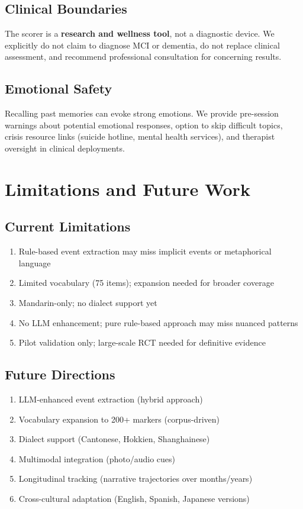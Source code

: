 \documentclass{article}
\begin{document}
\subsection{Clinical Boundaries}

The scorer is a \textbf{research and wellness tool}, not a diagnostic device. We explicitly do not claim to diagnose MCI or dementia, do not replace clinical assessment, and recommend professional consultation for concerning results.

\subsection{Emotional Safety}

Recalling past memories can evoke strong emotions. We provide pre-session warnings about potential emotional responses, option to skip difficult topics, crisis resource links (suicide hotline, mental health services), and therapist oversight in clinical deployments.

\section{Limitations and Future Work}

\subsection{Current Limitations}

\begin{enumerate}[label=(\arabic*)]
    \item Rule-based event extraction may miss implicit events or metaphorical language
    \item Limited vocabulary (75 items); expansion needed for broader coverage
    \item Mandarin-only; no dialect support yet
    \item No LLM enhancement; pure rule-based approach may miss nuanced patterns
    \item Pilot validation only; large-scale RCT needed for definitive evidence
\end{enumerate}

\subsection{Future Directions}

\begin{enumerate}[label=(\arabic*)]
    \item LLM-enhanced event extraction (hybrid approach)
    \item Vocabulary expansion to 200+ markers (corpus-driven)
    \item Dialect support (Cantonese, Hokkien, Shanghainese)
    \item Multimodal integration (photo/audio cues)
    \item Longitudinal tracking (narrative trajectories over months/years)
    \item Cross-cultural adaptation (English, Spanish, Japanese versions)
\end{enumerate}
\end{document}
